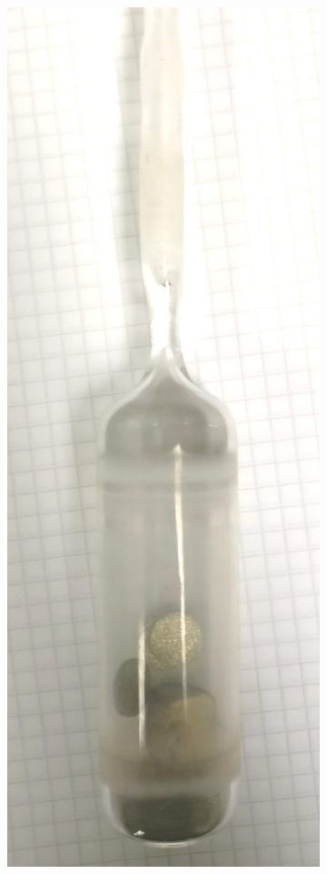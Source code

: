 \documentclass[a4paper,12pt,fleqn,twoside,openany]{book}
\begin{document}
 \begin{figure}[h]
    \centering
    \begin{subfigure}{0.1\textwidth}
        \includegraphics[width=\textwidth]{Img/Procedimiento/ampolla.jpg}

\end{subfigure}
\end{figure}
\end{document}
